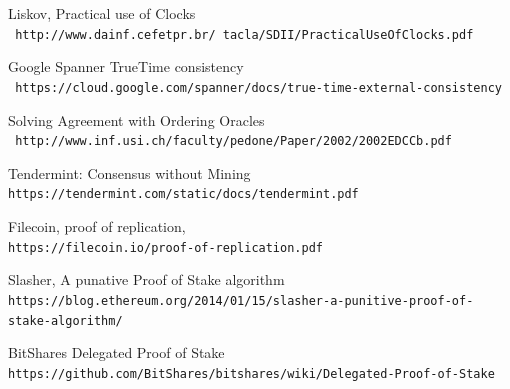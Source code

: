 \documentclass[12pt]{article}
\begin{document}



\begin{thebibliography}{9}
Liskov, Practical use of Clocks
\\\texttt{ http://www.dainf.cefetpr.br/~tacla/SDII/PracticalUseOfClocks.pdf}

Google Spanner TrueTime consistency
\\\texttt{ https://cloud.google.com/spanner/docs/true-time-external-consistency}

Solving Agreement with Ordering Oracles
\\\texttt{ http://www.inf.usi.ch/faculty/pedone/Paper/2002/2002EDCCb.pdf}

Tendermint: Consensus without Mining
\\\texttt{https://tendermint.com/static/docs/tendermint.pdf}

Filecoin, proof of replication,
\\\texttt{https://filecoin.io/proof-of-replication.pdf}

Slasher, A punative Proof of Stake algorithm
\\\texttt{https://blog.ethereum.org/2014/01/15/slasher-a-punitive-proof-of-stake-algorithm/}

BitShares Delegated Proof of Stake
\\\texttt{https://github.com/BitShares/bitshares/wiki/Delegated-Proof-of-Stake}
\end{thebibliography}
\end{document}
